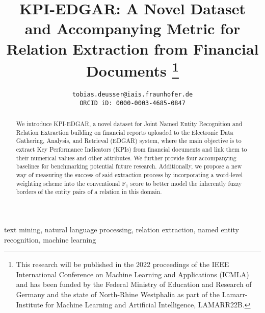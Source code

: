 \documentclass[conference, table]{IEEEtran}
\newcommand{\1} {\mathbbm{1}}
\begin{document}
\title{
KPI-EDGAR: A Novel Dataset and Accompanying Metric for Relation Extraction from Financial Documents
\thanks{This research will be published in the 2022 proceedings of the IEEE International Conference on Machine Learning and Applications (ICMLA) and has been funded by the Federal Ministry of Education and Research of Germany and the state of North-Rhine Westphalia as part of the Lamarr-Institute for Machine Learning and Artificial Intelligence, LAMARR22B.}
}

\author{
    \texttt{tobias.deusser@iais.fraunhofer.de}
    \\ \texttt{ORCID iD: 0000-0003-4685-0847}
}

\maketitle

\begin{abstract}
We introduce KPI-EDGAR, a novel dataset for Joint Named Entity Recognition and Relation Extraction building on financial reports uploaded to the Electronic Data Gathering, Analysis, and Retrieval (EDGAR) system, where the main objective is to extract Key Performance Indicators (KPIs) from financial documents and link them to their numerical values and other attributes. We further provide four accompanying baselines for benchmarking potential future research. Additionally, we propose a new way of measuring the success of said extraction process by incorporating a word-level weighting scheme into the conventional F$_1$ score to better model the inherently fuzzy borders of the entity pairs of a relation in this domain.
\end{abstract}

\begin{IEEEkeywords}
text mining, natural language processing, relation extraction, named entity recognition, machine learning
\end{IEEEkeywords}
\end{document}

